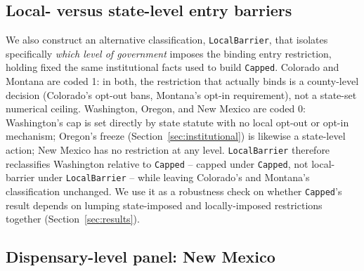 \documentclass[12pt]{article}
\begin{document}
\subsection{Local- versus state-level entry barriers}
\label{sec:localbarrier}

We also construct an alternative classification, \texttt{LocalBarrier}, that isolates specifically \emph{which
level of government} imposes the binding entry restriction, holding fixed the same institutional facts used to
build \texttt{Capped}. Colorado and Montana are coded 1: in both, the restriction that actually binds is a
county-level decision (Colorado's opt-out bans, Montana's opt-in requirement), not a state-set numerical
ceiling. Washington, Oregon, and New Mexico are coded 0: Washington's cap is set directly by state statute with
no local opt-out or opt-in mechanism; Oregon's freeze (Section~\ref{sec:institutional}) is likewise a
state-level action; New Mexico has no restriction at any level. \texttt{LocalBarrier} therefore reclassifies
Washington relative to \texttt{Capped} -- capped under \texttt{Capped}, not local-barrier under
\texttt{LocalBarrier} -- while leaving Colorado's and Montana's classification unchanged. We use it as a
robustness check on whether \texttt{Capped}'s result depends on lumping state-imposed and locally-imposed
restrictions together (Section~\ref{sec:results}).

\subsection{Dispensary-level panel: New Mexico}
\label{sec:nmdispensary}
\end{document}
